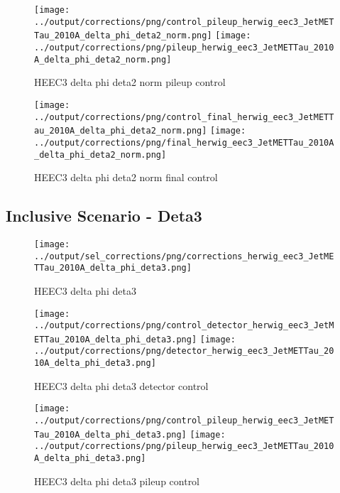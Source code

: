 \documentclass[11pt]{book}
\begin{document}
\begin{figure}[ht]
\centering
\texttt{[image: ../output/corrections/png/control\_pileup\_herwig\_eec3\_JetMETTau\_2010A\_delta\_phi\_deta2\_norm.png]}
\texttt{[image: ../output/corrections/png/pileup\_herwig\_eec3\_JetMETTau\_2010A\_delta\_phi\_deta2\_norm.png]}
\caption{HEEC3 delta phi deta2 norm pileup control}
\label{fig:HEEC3_JetMETTau_2010A_delta_phi_deta2_norm_pileup_control}
\end{figure}


\begin{figure}[ht]
\centering
\texttt{[image: ../output/corrections/png/control\_final\_herwig\_eec3\_JetMETTau\_2010A\_delta\_phi\_deta2\_norm.png]}
\texttt{[image: ../output/corrections/png/final\_herwig\_eec3\_JetMETTau\_2010A\_delta\_phi\_deta2\_norm.png]}
\caption{HEEC3 delta phi deta2 norm final control}
\label{fig:HEEC3_JetMETTau_2010A_delta_phi_deta2_norm_final_control}
\end{figure}


\clearpage
\subsection{Inclusive Scenario - Deta3}
\begin{figure}[ht]
\centering
\texttt{[image: ../output/sel\_corrections/png/corrections\_herwig\_eec3\_JetMETTau\_2010A\_delta\_phi\_deta3.png]}
\caption{HEEC3 delta phi deta3}
\label{fig:HEEC3_JetMETTau_2010A_delta_phi_deta3}
\end{figure}


\begin{figure}[ht]
\centering
\texttt{[image: ../output/corrections/png/control\_detector\_herwig\_eec3\_JetMETTau\_2010A\_delta\_phi\_deta3.png]}
\texttt{[image: ../output/corrections/png/detector\_herwig\_eec3\_JetMETTau\_2010A\_delta\_phi\_deta3.png]}
\caption{HEEC3 delta phi deta3 detector control}
\label{fig:HEEC3_JetMETTau_2010A_delta_phi_deta3_detector_control}
\end{figure}

\begin{figure}[ht]
\centering
\texttt{[image: ../output/corrections/png/control\_pileup\_herwig\_eec3\_JetMETTau\_2010A\_delta\_phi\_deta3.png]}
\texttt{[image: ../output/corrections/png/pileup\_herwig\_eec3\_JetMETTau\_2010A\_delta\_phi\_deta3.png]}
\caption{HEEC3 delta phi deta3 pileup control}
\label{fig:HEEC3_JetMETTau_2010A_delta_phi_deta3_pileup_control}
\end{figure}
\end{document}
